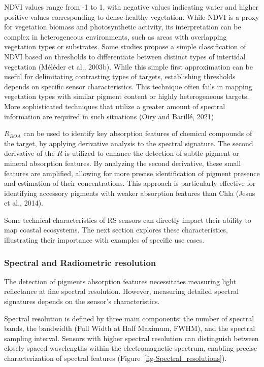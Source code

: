 \documentclass[
  letterpaper,
  11pt,
  english,
  singlespacing,
  headsepline]{MastersDoctoralThesis}
\begin{document}
\begin{spacing}{1.5}
NDVI values range from -1 to 1, with negative values indicating water
and higher positive values corresponding to dense healthy vegetation.
While NDVI is a proxy for vegetation biomass and photosynthetic
activity, its interpretation can be complex in heterogeneous
environments, such as areas with overlapping vegetation types or
substrates. Some studies propose a simple classification of NDVI based
on thresholds to differentiate between distinct types of intertidal
vegetation (Méléder et al., 2003b). While this simple first
approximation can be useful for delimitating contrasting types of
targets, establishing thresholds depends on specific sensor
characteristics. This technique often fails in mapping vegetation types
with similar pigment content or highly heterogeneous targets. More
sophisticated techniques that utilize a greater amount of spectral
information are required in such situations (Oiry and Barillé, 2021)

\(R_{BOA}\) can be used to identify key absorption features of chemical
compounds of the target, by applying derivative analysis to the spectral
signature. The second derivative of the \(R\) is utilized to enhance the
detection of subtle pigment or mineral absorption features. By analyzing
the second derivative, these small features are amplified, allowing for
more precise identification of pigment presence and estimation of their
concentrations. This approach is particularly effective for identifying
accessory pigments with weaker absorption features than Chla (Jesus et
al., 2014).

\begin{tcolorbox}
Some technical characteristics of RS sensors can directly impact their ability to map coastal ecosystems. The next section explores these characteristics, illustrating their importance with examples of specific use cases.
\end{tcolorbox}

\subsubsection{Spectral and Radiometric
resolution}\label{spectral-and-radiometric-resolution}

The detection of pigments absorption features necessitates measuring
light reflectance at fine spectral resolution. However, measuring
detailed spectral signatures depends on the sensor's characteristics.

Spectral resolution is defined by three main components: the number of
spectral bands, the bandwidth (Full Width at Half Maximum, FWHM), and
the spectral sampling interval. Sensors with higher spectral resolution
can distinguish between closely spaced wavelengths within the
electromagnetic spectrum, enabling precise characterization of spectral
features (Figure~\ref{fig-Spectral_resolutions}).


\end{spacing}
\end{document}

